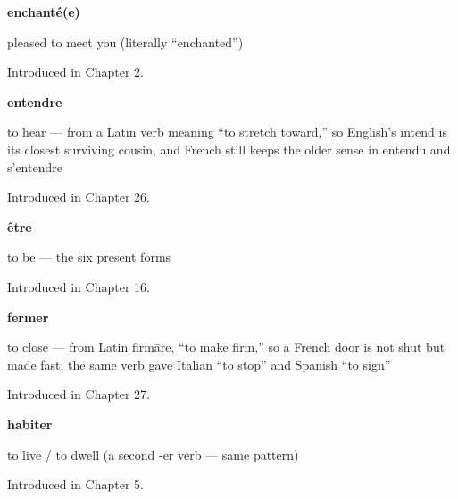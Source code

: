 \noindent\begin{minipage}[t]{\linewidth}
\raggedright
\textbf{enchanté(e)}\par
\small pleased to meet you (literally \textquotedblleft{}enchanted\textquotedblright{})\par
\footnotesize Introduced in Chapter 2.
\end{minipage}\par\medskip

\noindent\begin{minipage}[t]{\linewidth}
\raggedright
\textbf{entendre}\par
\small to hear — from a Latin verb meaning \textquotedblleft{}to stretch toward,\textquotedblright{} so English's intend is its closest surviving cousin, and French still keeps the older sense in entendu and s'entendre\par
\footnotesize Introduced in Chapter 26.
\end{minipage}\par\medskip

\noindent\begin{minipage}[t]{\linewidth}
\raggedright
\textbf{être}\par
\small to be — the six present forms\par
\footnotesize Introduced in Chapter 16.
\end{minipage}\par\medskip

\noindent\begin{minipage}[t]{\linewidth}
\raggedright
\textbf{fermer}\par
\small to close — from Latin firmāre, \textquotedblleft{}to make firm,\textquotedblright{} so a French door is not shut but made fast; the same verb gave Italian \textquotedblleft{}to stop\textquotedblright{} and Spanish \textquotedblleft{}to sign\textquotedblright{}\par
\footnotesize Introduced in Chapter 27.
\end{minipage}\par\medskip

\noindent\begin{minipage}[t]{\linewidth}
\raggedright
\textbf{habiter}\par
\small to live / to dwell (a second -er verb — same pattern)\par
\footnotesize Introduced in Chapter 5.
\end{minipage}\par\medskip


